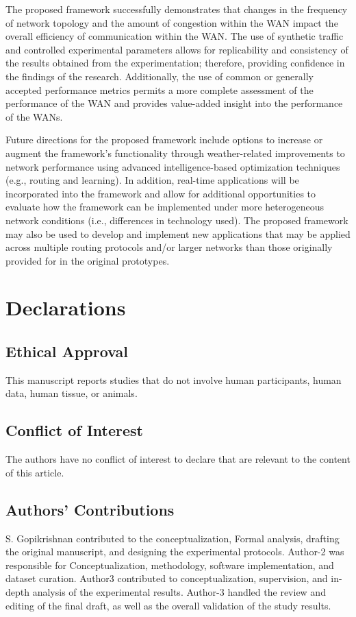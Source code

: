 \documentclass[a4paper,fleqn]{cas-dc}
\numberwithin{equation}{section}
\begin{document}
The proposed framework successfully demonstrates that changes in the frequency of network topology and the amount of congestion within the WAN impact the overall efficiency of communication within the WAN. The use of synthetic traffic and controlled experimental parameters allows for replicability and consistency of the results obtained from the experimentation; therefore, providing confidence in the findings of the research. Additionally, the use of common or generally accepted performance metrics permits a more complete assessment of the performance of the WAN and provides value-added insight into the performance of the WANs.

Future directions for the proposed framework include options to increase or augment the framework's functionality through weather-related improvements to network performance using advanced intelligence-based optimization techniques (e.g., routing and learning). In addition, real-time applications will be incorporated into the framework and allow for additional opportunities to evaluate how the framework can be implemented under more heterogeneous network conditions (i.e., differences in technology used). The proposed framework may also be used to develop and implement new applications that may be applied across multiple routing protocols and/or larger networks than those originally provided for in the original prototypes.

\section*{Declarations}
\subsection*{Ethical Approval}
This manuscript reports studies that do not involve human participants, human data, human tissue, or animals.

\subsection*{Conflict of Interest}
The authors have no conflict of interest to declare that are relevant to the content of this article.

\subsection*{Authors' Contributions}
S. Gopikrishnan contributed to the conceptualization, Formal analysis, drafting the original manuscript, and designing the experimental protocols. Author-2 was responsible for Conceptualization, methodology, software implementation, and dataset curation. Author3 contributed to conceptualization, supervision, and in-depth analysis of the experimental results. Author-3 handled the review and editing of the final draft, as well as the overall validation of the study results.
\end{document}
